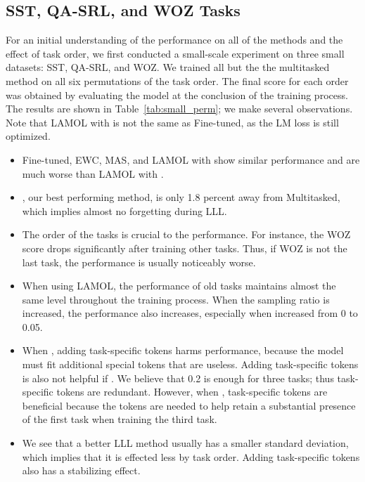 \documentclass{article} \usepackage{iclr2020_conference,times}
\begin{document}
\subsection{SST, QA-SRL, and WOZ Tasks}
For an initial understanding of the performance on all of the methods and the effect of task order, we first conducted a small-scale experiment on three small datasets: SST, QA-SRL, and WOZ.
We trained all but the the multitasked method on all six permutations of the task order.
The final score for each order was obtained by evaluating the model at the conclusion of the training process.
The results are shown in Table~\ref{tab:small_perm}; we make several observations.
Note that LAMOL with  is not the same as Fine-tuned, as the LM loss is still optimized.
\begin{itemize}[leftmargin=*]
    \item Fine-tuned, EWC, MAS, and LAMOL with  show similar performance and are much worse than LAMOL with .
    \item , our best performing method, is only 1.8 percent away from Multitasked, which implies almost no forgetting during LLL.
    \item The order of the tasks is crucial to the performance.
    For instance, the WOZ score drops significantly after training other tasks.
    Thus, if WOZ is not the last task, the performance is usually noticeably worse.
    \item When using LAMOL, the performance of old tasks maintains almost the same level throughout the training process.
    When the sampling ratio  is increased, the performance also increases, especially when increased from 0 to 0.05.
    \item When , adding task-specific tokens harms performance, because the model must fit additional special tokens that are useless.
    Adding task-specific tokens is also not helpful if . We believe that 0.2 is enough for three tasks; thus task-specific tokens are redundant.
    However, when , task-specific tokens are beneficial because the tokens are needed to help retain a substantial presence of the first task when training the third task.
    \item  We see that a better LLL method usually has a smaller standard deviation, which implies that it is effected less by task order. Adding task-specific tokens also has a stabilizing effect.
\end{itemize}
\end{document}
